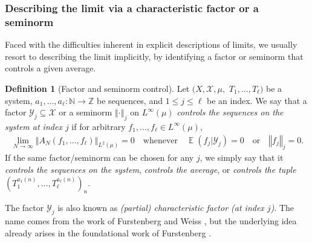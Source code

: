 \documentclass[11pt]{amsart}
\theoremstyle{definition}
\newtheorem{definition}[lemma]{Definition}
\DeclareMathOperator*{\E}{\mathbb{E}}
\newcommand{\N}{{\mathbb N}}
\newcommand{\Z}{{\mathbb Z}}
\newcommand{\CX}{{\mathcal X}}
\newcommand{\CY}{{\mathcal Y}}
\newcommand{\norm}[1]{\left\Vert #1\right\Vert}
\newcommand{\1}{{\mathbf{1}}}
\begin{document}
\subsubsection{Describing the limit via a characteristic factor or a seminorm}
Faced with the difficulties inherent in explicit descriptions of limits, 
we usually resort to describing the limit implicitly, by identifying a factor or seminorm that controls a given average. 
\begin{definition}[Factor and seminorm control]\label{D: control}
    Let $(X, \CX, \mu,$\! $T_1, \ldots, T_\ell)$ be a system, $a_1, \ldots, a_\ell:\N\to\Z$ be sequences, and $1\leq j\leq \ell$ be an index. We say that a factor $\CY_j\subseteq \CX$ or a seminorm $\norm{\cdot}_j$ on $L^\infty(\mu)$ \emph{controls the sequences on the system at index $j$} if for arbitrary $f_1, \ldots, f_\ell\in L^\infty(\mu)$,
\begin{align}\label{E: control}
\lim_{N\to\infty}\norm{A_N(f_1, \ldots, f_\ell)}_{L^2(\mu)} = 0 \quad \textrm{whenever}\quad \E(f_j|\CY_j) = 0 \quad \textrm{or}\quad \norm{f_j}_j = 0.
\end{align}
If the same factor/seminorm can be chosen for any $j$, we simply say that it \emph{controls the sequences on the system}, \emph{controls the average}, or \emph{controls the tuple $(T_1^{a_1(n)}, \ldots, T_\ell^{a_\ell(n)})_n$}.
\end{definition}
The factor $\CY_j$ is also known as \emph{(partial) characteristic factor (at index $j$)}. The name comes from the work of Furstenberg and Weiss \cite{FW96}, but the underlying idea already arises in the foundational work of Furstenberg \cite{Fu77}. 
\end{document}
